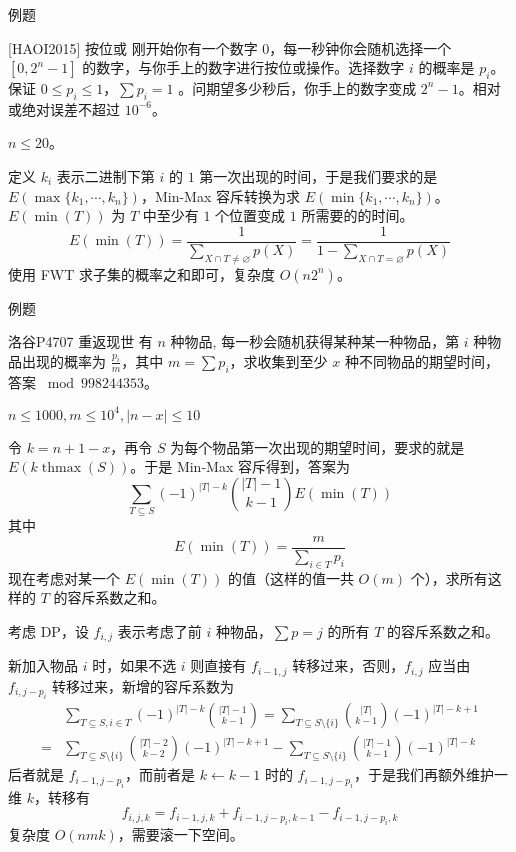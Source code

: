 \documentclass[UTF8]{beamer}
\begin{document}
    \begin{frame}{例题}
        \begin{block}{[HAOI2015] 按位或}
        刚开始你有一个数字 $0$，每一秒钟你会随机选择一个 $[0,2^n-1]$ 的数字，与你手上的数字进行按位或操作。选择数字 $i$ 的概率是 $p_i$。保证 $0\leq p_i \leq 1$，$\sum p_i=1$ 。问期望多少秒后，你手上的数字变成 $2^n-1$。相对或绝对误差不超过 $10^{-6}$。

        $n\leq 20$。
        \end{block}
        \pause
        定义 $k_i$ 表示二进制下第 $i$ 的 $1$ 第一次出现的时间，于是我们要求的是 $E(\max\{k_1,\cdots,k_n\})$，Min-Max 容斥转换为求 $E(\min\{k_1,\cdots,k_n\})$。$E(\min (T))$ 为 $T$ 中至少有 $1$ 个位置变成 $1$ 所需要的的时间。
        $$
        E(\min(T))=\frac{1}{\sum_{X\cap T\ne \varnothing} p(X)} = \frac{1}{1-\sum_{X\cap T=\varnothing} p(X)}
        $$
        使用 FWT 求子集的概率之和即可，复杂度 $O(n2^n)$。
    \end{frame}

    \begin{frame}{例题}
        \begin{block}{洛谷P4707 重返现世}
            有 $n$ 种物品, 每一秒会随机获得某种某一种物品，第 $i$ 种物品出现的概率为 $\frac{p_i}{m}$，其中 $m=\sum p_i$，求收集到至少 $x$ 种不同物品的期望时间，答案 $\bmod 998244353$。

            $n\le 1000,m\le 10^4, |n-x|\le 10$
        \end{block}
        \pause

        令 $k = n +1-x$，再令 $S$ 为每个物品第一次出现的期望时间，要求的就是 $E(k\operatorname{thmax}(S))$。于是 Min-Max 容斥得到，答案为
        $$
        \sum_{T\subseteq S}(-1)^{|T|-k}\binom{|T|-1}{k-1}E(\min(T))
        $$
        其中
        $$
        E(\min(T)) = \frac{m}{\sum_{i\in T}p_i}
        $$
        现在考虑对某一个 $E(\min(T))$ 的值（这样的值一共 $O(m)$ 个），求所有这样的 $T$ 的容斥系数之和。
    \end{frame}

    \begin{frame}
        考虑 DP，设 $f_{i,j}$ 表示考虑了前 $i$ 种物品，$\sum p= j$ 的所有 $T$ 的容斥系数之和。

        新加入物品 $i$ 时，如果不选 $i$ 则直接有 $f_{i-1,j}$ 转移过来，否则，$f_{i,j}$ 应当由 $f_{i,j-p_i}$ 转移过来，新增的容斥系数为
        $$
        \begin{aligned}
            &\sum_{T\subseteq S,i\in T}(-1)^{|T|-k}\binom{|T|-1}{k-1}=\sum_{T\subseteq S\setminus \{i\}} \binom{|T|}{k-1}(-1)^{|T|-k+1}\\
            =&\sum_{T\subseteq S\setminus \{i\}} \binom{|T|-2}{k-2}(-1)^{|T|-k+1}-\sum_{T\subseteq S\setminus \{i\}} \binom{|T|-1}{k-1}(-1)^{|T|-k}
        \end{aligned}
        $$
        后者就是 $f_{i-1,j-p_i}$，而前者是 $k\gets k-1$ 时的  $f_{i-1,j-p_i}$，于是我们再额外维护一维 $k$，转移有
        $$
        f_{i,j,k} = f_{i-1,j,k}+ f_{i-1,j-p_i,k-1}-f_{i-1,j-p_i,k}
        $$
        复杂度 $O(nmk)$，需要滚一下空间。
    \end{frame}
\end{document}

